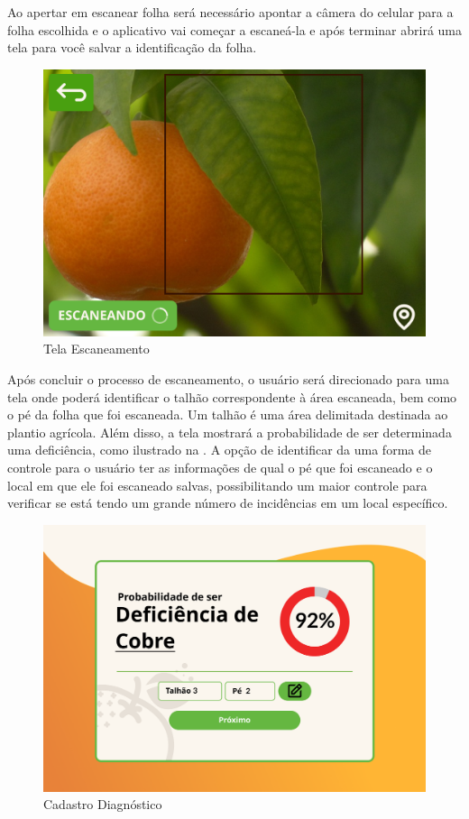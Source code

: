 \documentclass[
    a4paper,%
    12pt,%
    english,%
    brazilian,%
]{article}
\begin{document}
Ao apertar em escanear folha  será necessário apontar a câmera do celular para a folha escolhida e o aplicativo vai começar a escaneá-la e após terminar abrirá uma tela para você salvar a identificação da folha.


\begin{figure}[H]
\centering
\caption{Tela Escaneamento}%
\label{fig:tela-escaneamento}
\includegraphics[width=0.8\linewidth]{Logos/Tela-Escaneamento.png}
\end{figure}

Após concluir o processo de escaneamento, o usuário será direcionado para uma tela onde poderá identificar o talhão correspondente à área escaneada, bem como o pé da folha que foi escaneada. Um talhão é uma área delimitada destinada ao plantio agrícola. Além disso, a tela mostrará a probabilidade de ser determinada uma deficiência, como ilustrado na . A opção de identificar da uma forma de controle para o usuário ter as informações de qual o pé que foi escaneado e o local em que ele foi escaneado salvas, possibilitando um maior controle para verificar se está tendo um grande número de incidências em um local específico.

\begin{figure}[H]
\centering
\caption{Cadastro Diagnóstico}%
\label{fig:cadastro-diagnóstico}
\includegraphics[width=0.8\linewidth]{Logos/Cadastro-diagnostico.png}
\end{figure}
\end{document}
